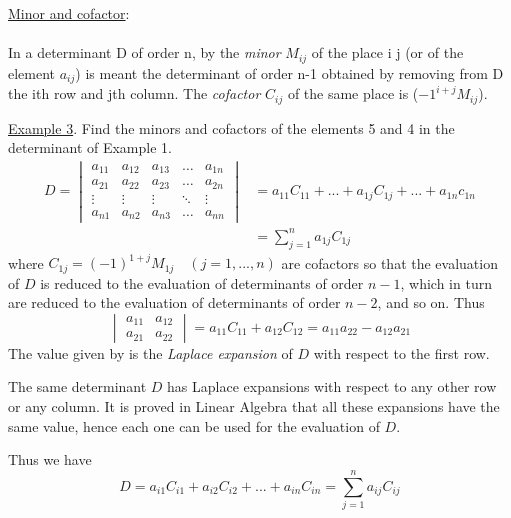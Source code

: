 \documentclass[11pt]{amsbook}
\begin{document}
    \underline{Minor and cofactor}: 
    \paragraph{} In a determinant D of order n, by the \emph{minor} $M_{ij}$ of  the place i j (or of the element $a_{ij}$) is meant the determinant  of order n-1 obtained by removing from D the ith row and jth column. The \emph{cofactor} $C_{ij}$ of the same place is ($-1^{i+j} M_{ij}$).

    \underline{Example 3}. Find the minors and cofactors of the elements 5 and 4 in the determinant of Example 1.
\begin{equation} \label{eq:b2p1_238_firstEquation}
\begin{aligned}
D = \begin{vmatrix}
    a_{11} & a_{12} & a_{13} & \dots  & a_{1n} \\
    a_{21} & a_{22} & a_{23} & \dots  & a_{2n} \\
    \vdots & \vdots & \vdots & \ddots & \vdots \\
    a_{n1} & a_{n2} & a_{n3} & \dots  & a_{nn} 
\end{vmatrix} &= a_{11}C_{11} +  ... + a_{1j}C_{1j} + ... + a_{1n}c_{1n} \\ &= \sum_{j=1}^n  a_{1j}C_{1j}
\end{aligned}
\end{equation}
where $C_{1j} = (-1)^{1+j} M_{1j} \quad (j = 1 , ... , n)$ are cofactors so that
the evaluation of $D$ is reduced to the evaluation of determinants
of order $n - 1$, which in turn are reduced to the evaluation of
determinants of order $n - 2$, and so on. Thus
$$
\begin{vmatrix}
	a_{11} & a_{12} \\
	a_{21} & a_{22}
\end{vmatrix} = a_{11}C_{11} + a_{12}C_{12} = a_{11}a_{22} - a_{12}a_{21}
$$
The value given by  is the \textit{Laplace expansion} of $D$ with respect
to the first row.
\par The same determinant $D$ has Laplace expansions with
respect to any other row or any column. It is proved in Linear
Algebra that all these expansions have the same value, hence
each one can be used for the evaluation of $D$.
\par Thus we have
\begin{equation}
D = a_{i1}C_{i1} + a_{i2}C_{i2} + ... + a_{in}C_{in} = \sum_{j=1}^n a_{ij}C_{ij}
\end{equation}
\end{document}
